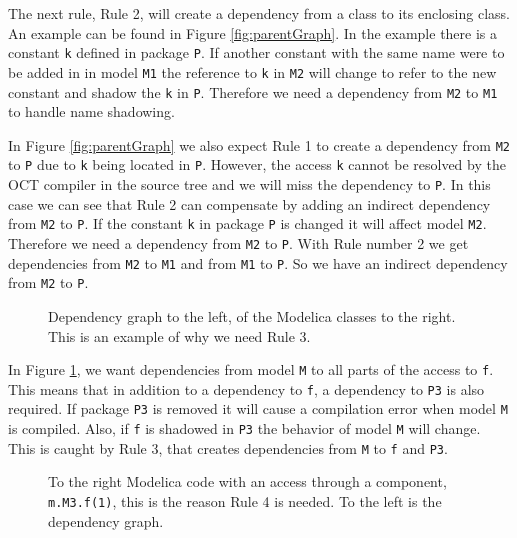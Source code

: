 \documentclass{cslthse-msc}
\begin{document}
The next rule, Rule 2, will create a dependency from a class to its enclosing class. An example can be found in Figure \ref{fig:parentGraph}. In the example there is a constant \texttt{k} defined in package \texttt{P}. If another constant with the same name were to be added in in model \texttt{M1} the reference to \texttt{k} in \texttt{M2} will change to refer to the new constant and shadow the \texttt{k} in \texttt{P}. Therefore we need a dependency from \texttt{M2} to \texttt{M1} to handle name shadowing.

In Figure \ref{fig:parentGraph} we also expect Rule 1 to create a dependency from \texttt{M2} to \texttt{P} due to \texttt{k} being located in \texttt{P}. However, the access \texttt{k} cannot be resolved by the OCT compiler in the source tree and we will miss the dependency to \texttt{P}. In this case we can see that Rule 2 can compensate by adding an indirect dependency from \texttt{M2} to \texttt{P}. 
If the constant \texttt{k} in package \texttt{P} is changed it will affect model \texttt{M2}. Therefore we need a dependency from \texttt{M2} to \texttt{P}. With Rule number 2 we get dependencies from \texttt{M2} to \texttt{M1} and from \texttt{M1} to \texttt{P}. So we have an indirect dependency from \texttt{M2} to \texttt{P}.

\begin{figure}[!htbp]
    \centering
    \qquad
    \caption{Dependency graph to the left, of the Modelica classes to the right. This is an example of why we need Rule 3.}
    \label{fig:dotAccess}
\end{figure}

In Figure \ref{fig:dotAccess}, we want dependencies from model \texttt{M} to all parts of the access to \texttt{f}. This means that in addition to a dependency to \texttt{f}, a dependency to \texttt{P3} is also required. If package \texttt{P3} is removed it will cause a compilation error when model \texttt{M} is compiled. Also, if \texttt{f} is shadowed in \texttt{P3} the behavior of model \texttt{M} will change. This is caught by Rule 3, that creates dependencies from \texttt{M} to \texttt{f} and \texttt{P3}.


\begin{figure}[!htbp]
    \centering
    \qquad
    \subfloat{\raisebox{4.7 cm}{}}
    \caption{To the right Modelica code with an access through a component, \texttt{m.M3.f(1)}, this is the reason Rule 4 is needed. To the left is the dependency graph.}
    \label{fig:component}
\end{figure}
\end{document}
